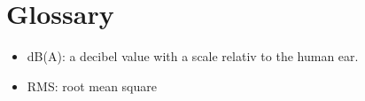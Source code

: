 \section{Glossary}
\begin{itemize}
    \item dB(A): a decibel value with a scale relativ to the human ear.
    \item RMS: root mean square
\end{itemize}

